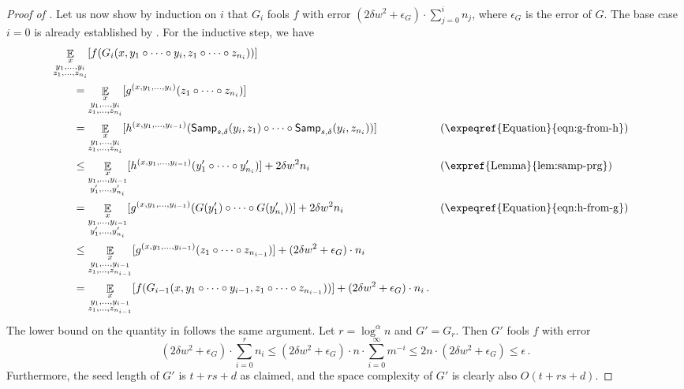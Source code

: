 \documentclass{toc}
\DeclareMathOperator*{\ExpVal}{\mathbb{E}}
\begin{document}
\begin{proof}[Proof of ]
Let us now show by induction on $i$ that $G_i$ fools $f$ with error $(2\delta w^2 + \epsilon_G) \cdot \sum_{j = 0}^i n_j$, where $\epsilon_G$ is the error of $G$. The base case $i = 0$ is already established by . For the inductive step, we have
\begin{align}
&\ExpVal_{\substack{x \\ y_1, \dots, y_i \\ z_1, \dots, z_{n_i}}}[f(G_i(x, y_1 \circ \dots \circ y_i, z_1 \circ \dots \circ z_{n_i}))] \label{eqn:prg-exp} \\
&\qquad= \ExpVal_{\substack{x \\ y_1, \dots, y_i \\ z_1, \dots, z_{n_i}}}[g^{(x, y_1, \dots, y_i)}(z_1 \circ \dots \circ z_{n_i})] \nonumber \\
&\qquad= \ExpVal_{\substack{x \\ y_1, \dots, y_i \\ z_1, \dots, z_{n_i}}}[h^{(x, y_1, \dots, y_{i - 1})}(\mathsf{Samp}_{s, \delta}(y_i, z_1) \circ \dots \circ \mathsf{Samp}_{s, \delta}(y_i, z_{n_i}))] && (\text{\expeqref{Equation}{eqn:g-from-h}}) \nonumber \\
&\qquad\leq \ExpVal_{\substack{x \\ y_1, \dots, y_{i - 1} \\ y_1', \dots, y_{n_i}'}}[h^{(x, y_1, \dots, y_{i - 1})}(y_1' \circ \dots \circ y_{n_i}')] + 2\delta w^2 n_i && \text{(\expref{Lemma}{lem:samp-prg})} \nonumber \\
&\qquad= \ExpVal_{\substack{x \\ y_1, \dots, y_{i - 1} \\ y_1', \dots, y_{n_i}'}}[g^{(x, y_1, \dots, y_{i - 1})}(G(y_1') \circ \dots \circ G(y_{n_i}'))] + 2\delta w^2 n_i && (\text{\expeqref{Equation}{eqn:h-from-g}}) \nonumber \\
&\qquad\leq \ExpVal_{\substack{x \\ y_1, \dots, y_{i - 1} \\ z_1, \dots, z_{n_{i - 1}}}}[g^{(x, y_1, \dots, y_{i - 1})}(z_1 \circ \dots \circ z_{n_{i - 1}})] + (2\delta w^2 + \epsilon_G) \cdot n_i \nonumber \\
&\qquad= \ExpVal_{\substack{x \\ y_1, \dots, y_{i - 1} \\ z_1, \dots, z_{n_{i - 1}}}}[f(G_{i - 1}(x, y_1 \circ \dots \circ y_{i - 1}, z_1 \circ \dots \circ z_{n_{i - 1}}))] + (2\delta w^2 + \epsilon_G) \cdot n_i\,. \nonumber
\end{align}
The lower bound on the quantity in  follows the same argument.
Let $r = \log^{\alpha} n$ and $G' = G_r$. Then $G'$ fools $f$ with error
$$
(2\delta w^2 + \epsilon_G) \cdot \sum_{i = 0}^r n_i \leq (2\delta w^2 + \epsilon_G) \cdot n \cdot \sum_{i = 0}^{\infty} m^{-i} \leq 2n \cdot (2\delta w^2 + \epsilon_G) \leq \epsilon\,.
$$
Furthermore, the seed length of $G'$ is $t + rs + d$ as claimed, and the space complexity of $G'$ is clearly also $O(t + rs + d)$.
\end{proof}
\end{document}
